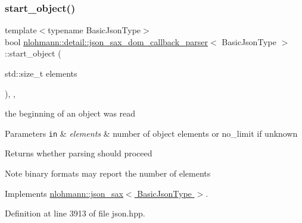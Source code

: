 \subsubsection{\texorpdfstring{start\+\_\+object()}{start\_object()}}
{\footnotesize\ttfamily template$<$typename Basic\+Json\+Type$>$ \\
bool \hyperlink{classnlohmann_1_1detail_1_1json__sax__dom__callback__parser}{nlohmann\+::detail\+::json\+\_\+sax\+\_\+dom\+\_\+callback\+\_\+parser}$<$ Basic\+Json\+Type $>$\+::start\+\_\+object (\begin{DoxyParamCaption}\item[{std\+::size\+\_\+t}]{elements }\end{DoxyParamCaption})\hspace{0.3cm}{\ttfamily [inline]}, {\ttfamily [override]}, {\ttfamily [virtual]}}



the beginning of an object was read 


\begin{DoxyParams}[1]{Parameters}
\mbox{\tt in}  & {\em elements} & number of object elements or no\+\_\+limit if unknown \\
\hline
\end{DoxyParams}
\begin{DoxyReturn}{Returns}
whether parsing should proceed 
\end{DoxyReturn}
\begin{DoxyNote}{Note}
binary formats may report the number of elements 
\end{DoxyNote}


Implements \hyperlink{structnlohmann_1_1json__sax_a447db60efaabc614492c449e640719cf}{nlohmann\+::json\+\_\+sax$<$ Basic\+Json\+Type $>$}.



Definition at line 3913 of file json.\+hpp.

\mbox{\label{classnlohmann_1_1detail_1_1json__sax__dom__callback__parser_aadc7fe390bdd8fb721b6789bd80a5903}} 
